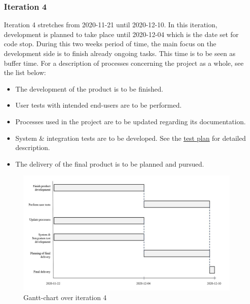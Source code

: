 \subsubsection{Iteration 4}
Iteration 4 stretches from 2020-11-21 until 2020-12-10. In this iteration, development is planned to take place until 2020-12-04 which is the date set for code stop. During this two weeks period of time, the main focus on the development side is to finish already ongoing tasks. This time is to be seen as buffer time. For a description of processes concerning the project as a whole, see the list below:
\begin{itemize}
    \item The development of the product is to be finished. 
    \item User tests with intended end-users are to be performed.
    \item Processes used in the project are to be updated regarding its documentation. 
    \item System \& integration tests are to be developed. See the \href{https://gitlab.liu.se/tddc88-company-3-2020/deploy/-/tree/Document_branch/Test_Plan}{\underline{test plan}} for detailed description.
    \item The delivery of the final product is to be planned and pursued. 
\end{itemize}

\begin{figure}[H]
\centering
\includegraphics[width=\linewidth]{Pictures/iteration_4.JPG}
\caption{Gantt-chart over iteration 4}
\label{fig:iteration_4}
\end{figure}

